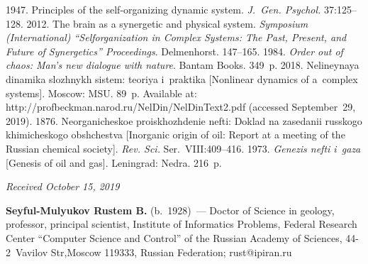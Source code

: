 \begin{multicols}{2}
{{\begin{thebibliography}{99}
 1947. Principles of the self-organizing dynamic system. 
\textit{J.~Gen. Psychol.} 37:125--128.
 2012. The brain as a synergetic and physical system. \textit{Symposium  
(International) ``Selforganization in Complex Systems: The Past, Present, and Future of Synergetics'' 
Proceedings}. Delmenhorst. 147--165.
 1984. \textit{Order out of chaos: Man's
new dialogue with nature}. Bantam Books. 349~p.
 2018. Nelineynaya dinamika slozhnykh sistem: teoriya i~praktika 
[Nonlinear 
dynamics of a~complex systems]. Moscow: MSU. 89~p. Available at: {\sf 
http://profbeckman.narod.ru/NelDin/NelDinText2.pdf} (accessed September~29, 2019).
 1876. Neorganicheskoe proiskhozhdenie nefti: Doklad na zasedanii 
russkogo khimicheskogo obshchestva [Inorganic origin of oil: Report at a meeting of the Russian 
chemical society]. \textit{Rev. Sci.} Ser.~VIII:409--416.
 1973. \textit{Genezis nefti i~gaza} [Genesis of oil and gas]. Leningrad: 
Nedra. 216~p.
\end{thebibliography}

 }
 }

\end{multicols}

\vspace*{-6pt}

\hfill{\small\textit{Received October 15, 2019}}



\Contrl

\noindent
\textbf{Seyful-Mulyukov Rustem B.} (b.\ 1928)~--- Doctor of Science in geology, professor, principal scientist, 
Institute of Informatics Problems, Federal Research Center ``Computer Science and Control'' of the Russian 
Academy of Sciences, 44-2~Vavilov Str,Moscow 119333, Russian Federation; \mbox{rust@ipiran.ru}
\label{end\stat}

\renewcommand{\bibname}{\protect\rm Литература}  
    